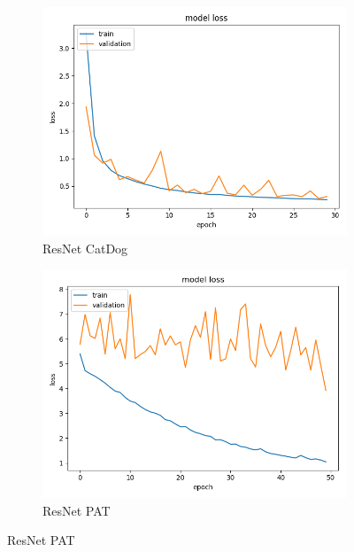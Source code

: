 \begin{figure}
\begin{subfigure}[b]{.45\linewidth}
\includegraphics[width=\linewidth]{Figs/resnet_catdog_loss.jpg}
\caption{ResNet CatDog}
\end{subfigure}
\begin{subfigure}[b]{.45\linewidth}
\includegraphics[width=\linewidth]{Figs/resnet_pat_loss.jpg}
\caption{ResNet PAT}
\end{subfigure}


\end{figure}
